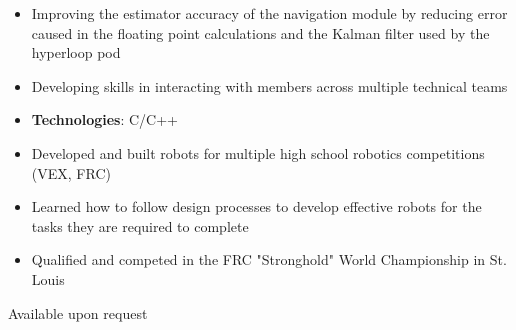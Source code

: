 \documentclass[10pt, letterpaper, ragged2e, withhyper]{altacv}
\begin{document}
\begin{paracol}{2}
    
    \begin{itemize}
        \item Improving the estimator accuracy of the navigation module by reducing error caused in the floating point
        calculations and the Kalman filter used by the hyperloop pod
        \item Developing skills in interacting with members across multiple technical teams
        \item \textbf{Technologies}: C/C++
    \end{itemize}

    \begin{itemize}
        \item Developed and built robots for multiple high school robotics competitions (VEX, FRC)
        \item Learned how to follow design processes to develop effective robots for the tasks they are required to complete
        \item Qualified and competed in the FRC "Stronghold" World Championship in St. Louis 
    \end{itemize}

    Available upon request

\end{paracol}
\end{document}
